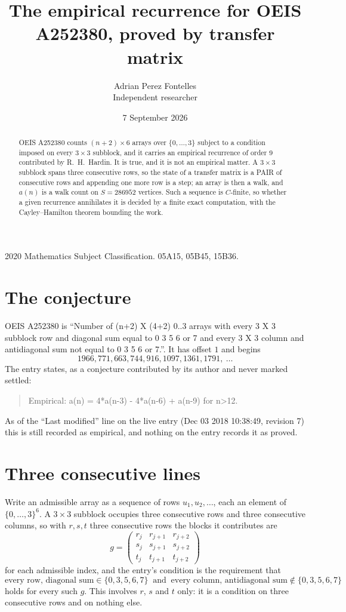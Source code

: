 \documentclass[11pt,a4paper]{article}
\title{The empirical recurrence for OEIS A252380, proved by transfer matrix}
\author{Adrian Perez Fontelles\\ \small Independent researcher}
\date{7 September 2026}
\theoremstyle{plain}
\theoremstyle{definition}
\begin{document}
\maketitle

\begin{abstract}
OEIS A252380 counts $(n+2)\times6$ arrays over $\{0,\dots,3\}$ subject to a condition imposed on
every $3\times3$ subblock, and it carries an empirical recurrence of order $9$
contributed by R.~H.~Hardin. It is true, and it is not an empirical matter. A $3\times3$
subblock spans three consecutive rows, so the state of a transfer matrix is a PAIR of
consecutive rows and appending one more row is a step; an array is then a walk, and
$a(n)$ is a walk count on $S=286952$ vertices. Such a sequence is $C$-finite, so whether a given
recurrence annihilates it is decided by a finite exact computation, with the Cayley--Hamilton
theorem bounding the work.
\end{abstract}

\noindent\small 2020 Mathematics Subject Classification. 05A15, 05B45, 15B36.\normalsize

\section{The conjecture}

OEIS A252380 is ``Number of (n+2) X (4+2) 0..3 arrays with every 3 X 3 subblock row and diagonal sum equal to 0 3 5 6 or 7 and every 3 X 3 column and antidiagonal sum not equal to 0 3 5 6 or 7.''. It has offset $1$ and begins
\[
1966, 771, 663, 744, 916, 1097, 1361, 1791,\ \dots
\]
The entry states, as a conjecture contributed by its author and never marked settled:
\begin{quote}
Empirical: a(n) = 4*a(n-3) - 4*a(n-6) + a(n-9) for n>12.
\end{quote}
As of the ``Last modified'' line on the live entry (Dec 03 2018 10:38:49, revision 7) this is still
recorded as empirical, and nothing on the entry records it as proved.

\section{Three consecutive lines}

Write an admissible array as a sequence of rows $u_1,u_2,\dots$, each an element of
$\{0,\dots,3\}^{6}$. A $3\times3$ subblock occupies three consecutive rows and
three consecutive columns, so with $r,s,t$ three consecutive rows the blocks it
contributes are
\[
g=\begin{pmatrix}r_j&r_{j+1}&r_{j+2}\\ s_j&s_{j+1}&s_{j+2}\\ t_j&t_{j+1}&t_{j+2}\end{pmatrix}
\]
for each admissible index, and the entry's condition is the requirement that
\[
\text{every row, diagonal sum} \in \{0,3,5,6,7\}\ \text{ and }\ \text{every column, antidiagonal sum} \notin \{0,3,5,6,7\}
\]
holds for every such $g$. This involves $r$, $s$ and $t$ only: it is a condition on
three consecutive rows and on nothing else.
\end{document}

